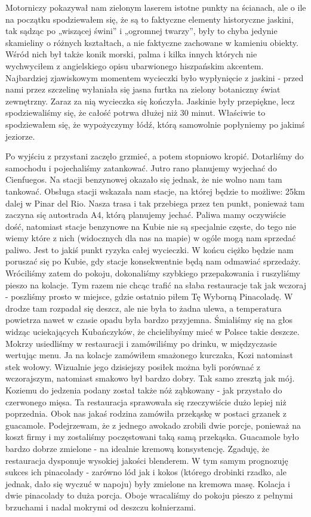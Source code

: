 Motorniczy pokazywał nam zielonym laserem istotne punkty na ścianach, ale o ile na początku spodziewałem się, że są to faktyczne elementy historyczne jaskini, tak sądząc po „wiszącej świni” i „ogromnej twarzy”, były to chyba jedynie skamieliny o różnych kształtach, a nie faktyczne zachowane w kamieniu obiekty.
Wśród nich był także konik morski, palma i kilka innych których nie wychwyciłem z angielskiego opisu ubarwionego hiszpańskim akcentem.
Najbardziej zjawiskowym momentem wycieczki było wypłynięcie z jaskini - przed nami przez szczelinę wyłaniała się jasna furtka na zielony botaniczny świat zewnętrzny.
Zaraz za nią wycieczka się kończyła.
Jaskinie były przepiękne, lecz spodziewaliśmy się, że całość potrwa dłużej niż 30 minut.
Właściwie to spodziewałem się, że wypożyczymy łódź, którą samowolnie popłyniemy po jakimś jeziorze.
\par Po wyjściu z przystani zaczęło grzmieć, a potem stopniowo kropić.
Dotarliśmy do samochodu i pojechaliśmy zatankować.
Jutro rano planujemy wyjechać do Cienfuegos.
Na stacji benzynowej okazało się jednak, że nie wolno nam tam tankować.
Obsługa stacji wskazała nam stacje, na której będzie to możliwe: 25km dalej w Pinar del Rio.
Nasza trasa i tak przebiega przez ten punkt, ponieważ tam zaczyna się autostrada A4, którą planujemy jechać.
Paliwa mamy oczywiście dość, natomiast stacje benzynowe na Kubie nie są specjalnie częste, do tego nie wiemy które z nich (widocznych dla nas na mapie) w ogóle mogą nam sprzedać paliwo.
Jest to jakiś punkt ryzyka całej wycieczki.
W końcu ciężko będzie nam poruszać się po Kubie, gdy stacje konsekwentnie będą nam odmawiać sprzedaży.
Wróciliśmy zatem do pokoju, dokonaliśmy szybkiego przepakowania i ruszyliśmy pieszo na kolacje.
Tym razem nie chcąc trafić na słaba restauracje tak jak wczoraj - poszliśmy prosto w miejsce, gdzie ostatnio piłem Tę Wyborną Pinacoladę.
W drodze tam rozpadał się deszcz, ale nie była to żadna ulewa, a temperatura powietrza nawet w czasie opadu była bardzo przyjemna.
Śmialiśmy się na głos widząc uciekających Kubańczyków, że chcielibyśmy mieć w Polsce takie deszcze.
 Mokrzy usiedliśmy w restauracji i zamówiliśmy po drinku, w międzyczasie wertując menu.
Ja na kolacje zamówiłem smażonego kurczaka, Kozi natomiast stek wołowy.
Wizualnie jego dzisiejszy posiłek można byli porównać z wczorajszym, natomiast smakowo był bardzo dobry.
Tak samo zresztą jak mój.
Koziemu do jedzenia podany został także nóż ząbkowany - jak przystało do czerwonego mięsa.
Ta restauracja sprawowała się rzeczywiście dużo lepiej niż poprzednia.
Obok nas jakaś rodzina zamówiła przekąskę w postaci grzanek z guacamole.
Podejrzewam, że z jednego awokado zrobili dwie porcje, ponieważ na koszt firmy i my zostaliśmy poczęstowani taką samą przekąska.
Guacamole było bardzo dobrze zmielone - na idealnie kremową konsystencję.
Zgaduję, że restauracja dysponuje wysokiej jakości blenderem.
W tym samym prognozuję sukces ich pinacolady - zarówno lód jak i kokos (którego drobinki rzadko, ale jednak, dało się wyczuć w napoju) były zmielone na kremowa masę.
Kolacja i dwie pinacolady to duża porcja.
Oboje wracaliśmy do pokoju pieszo z pełnymi brzuchami i nadal mokrymi od deszczu kołnierzami.